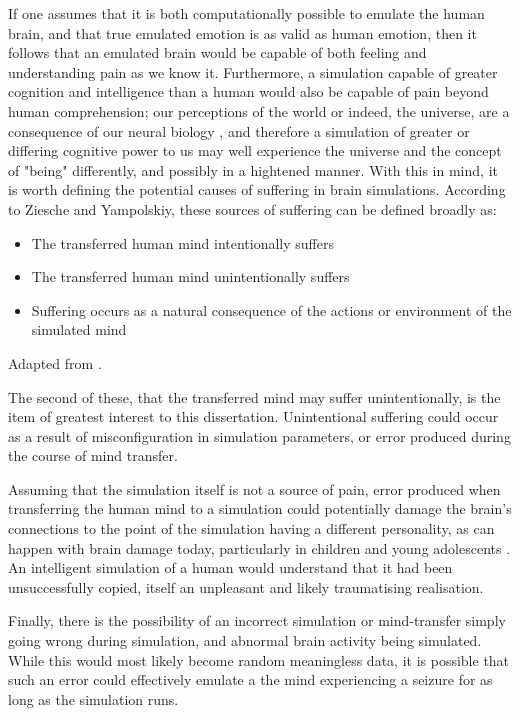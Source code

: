 If one assumes that it is both computationally possible to emulate the human
brain, and that true emulated emotion is as valid as human emotion,
then it follows that an emulated brain would be capable of both feeling and
understanding pain as we know it. Furthermore, a simulation capable of greater
cognition and intelligence than a human would also be capable of pain beyond
human comprehension; our perceptions of the world or indeed, the universe, are a
consequence of our neural biology \autocite{eagleman_human_2008}, and therefore
a simulation of greater or differing cognitive power to us may well experience
the universe and the concept of "being" differently, and possibly in a hightened
manner. With this in mind, it is worth defining the potential
causes of suffering in brain simulations. According to Ziesche and Yampolskiy,
these sources of suffering can be defined broadly as:

\begin{itemize}
    \itemsep-0.2em
    \item The transferred human mind intentionally suffers
    \item The transferred human mind unintentionally suffers
    \item Suffering occurs as a natural consequence of the actions or
    environment of the simulated mind
\end{itemize}
Adapted from \autocite{ziesche_no_2019-1}.

The second of these, that the transferred mind may suffer unintentionally, is
the item of greatest interest to this dissertation. Unintentional suffering
could occur as a result of misconfiguration in simulation parameters, or error
produced during the course of mind transfer. 

Assuming that the simulation itself is not a source of pain, error produced when
transferring the human mind to a simulation could potentially damage the brain's
connections to the point of the simulation having a different personality, as
can happen with brain damage today, particularly in children and young
adolescents \autocite{max_personality_2015}. An intelligent simulation of a
human would understand that it had been unsuccessfully copied, itself an
unpleasant and likely traumatising realisation.

Finally, there is the possibility of an incorrect simulation or mind-transfer
simply going wrong during simulation, and abnormal brain activity being
simulated. While this would most likely become random meaningless data, it is
possible that such an error could effectively emulate a the mind
experiencing a seizure for as long as the simulation runs. 
 
